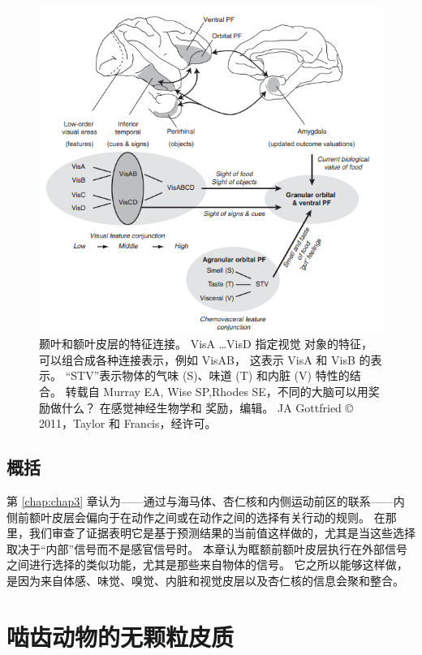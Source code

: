 \begin{figure}[!htb]
	\centering
	\includegraphics{image_pfc/Fig_4_3}
	\caption{颞叶和额叶皮层的特征连接。
		VisA …VisD 指定视觉
		对象的特征，可以组合成各种连接表示，例如 VisAB，
		这表示 VisA 和 VisB 的表示。 
		“STV”表示物体的气味 (S)、味道 (T) 和内脏 (V) 特性的结合。 转载自 Murray EA, Wise SP,Rhodes SE，不同的大脑可以用奖励做什么？ 
		在感觉神经生物学和
		奖励，编辑。 JA Gottfried © 2011，Taylor 和 Francis，经许可。}\label{fig:fig_4_3}
\end{figure}



\subsection{概括}

第 \ref{chap:chap3} 章认为——通过与海马体、杏仁核和内侧运动前区的联系——内侧前额叶皮层会偏向于在动作之间或在动作之间的选择有关行动的规则。
在那里，我们审查了证据表明它是基于预测结果的当前值这样做的，尤其是当这些选择取决于“内部”信号而不是感官信号时。
本章认为眶额前额叶皮层执行在外部信号之间进行选择的类似功能，尤其是那些来自物体的信号。
它之所以能够这样做，是因为来自体感、味觉、嗅觉、内脏和视觉皮层以及杏仁核的信息会聚和整合。



\section{啮齿动物的无颗粒皮质}

